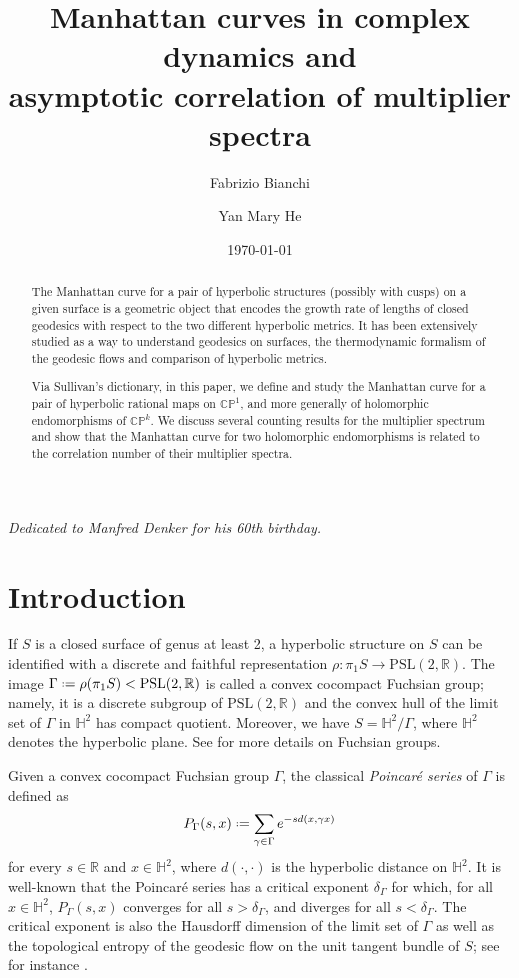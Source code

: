 \documentclass[11pt]{amsart}
\title{Manhattan curves in complex dynamics
and \\ asymptotic correlation
of multiplier spectra}
\author{Fabrizio Bianchi}
\author{Yan Mary He}
\date{\today}
\theoremstyle{plain}
\theoremstyle{definition}
\theoremstyle{remark}
\newcommand{\PSL}{\text{PSL}}
\newcommand*{\defeq}{\mathrel{\vcenter{\baselineskip0.5ex \lineskiplimit0pt
			\hbox{\scriptsize.}\hbox{\scriptsize.}}}%
	=}
\begin{document}
\maketitle

\begin{center}
\emph{Dedicated to Manfred Denker for 
his 60th birthday.}
\end{center}

\begin{abstract}
The Manhattan curve for a pair of hyperbolic structures (possibly with cusps) on a given surface is a geometric object that encodes the growth rate of lengths of closed geodesics with respect to the two different hyperbolic metrics. It has been extensively studied as a way to understand geodesics on surfaces, the thermodynamic formalism of the geodesic flows and
comparison of hyperbolic metrics.

Via Sullivan's dictionary, in this paper, we define and study
the Manhattan curve for a pair of 
hyperbolic rational
maps on $\mathbb C\mathbb P^1$,
and more generally of
holomorphic endomorphisms of $\mathbb{C}\mathbb{P}^k$.
We discuss several counting results
for the multiplier spectrum 
and show that the Manhattan curve for two holomorphic endomorphisms is related to the correlation number of their multiplier
spectra.
\end{abstract}


\section{Introduction}
If $S$ is a closed surface of genus at least 2, a hyperbolic structure on $S$ can be identified with a discrete and faithful representation $\rho \colon \pi_1S \to \PSL(2,\mathbb{R})$. The image $\Gamma\defeq \rho(\pi_1S) < \PSL(2,\mathbb{R})$ is called a convex cocompact Fuchsian group; namely, it is a discrete subgroup of $\PSL(2,\mathbb{R})$ and the convex hull of the limit set
of $\Gamma$ in $\mathbb{H}^2$ has compact quotient. Moreover, we have $S = \mathbb{H}^2/\Gamma$, where $\mathbb{H}^2$ denotes the hyperbolic plane. See \cite{Nicholls89,KatokS_92} for more details on Fuchsian groups. 

Given a convex cocompact Fuchsian group $\Gamma$, the classical {\it Poincar\'e series} of $\Gamma$ is defined as
$$P_\Gamma(s,x) \defeq \sum_{\gamma \in \Gamma}e^{-sd(x,\gamma x)}$$
for every $s \in \mathbb{R}$
and $x \in \mathbb{H}^2$, where
$d(\cdot, \cdot)$ is the hyperbolic distance on $\mathbb{H}^2$. It is well-known \cite{Nicholls89}
that the Poincar\'e series has a critical exponent $\delta_\Gamma$ for which,
for all $x \in \mathbb{H}^2$,
$P_\Gamma(s,x)$ converges for all
$s > \delta_\Gamma$,  and diverges for all
$s <\delta_\Gamma$.
The critical exponent is also the Hausdorff dimension of the limit set of $\Gamma$ as well as the topological entropy of the geodesic flow on the unit tangent bundle of $S$; see for instance \cite{Sullivan79, Nicholls89}.
\end{document}
